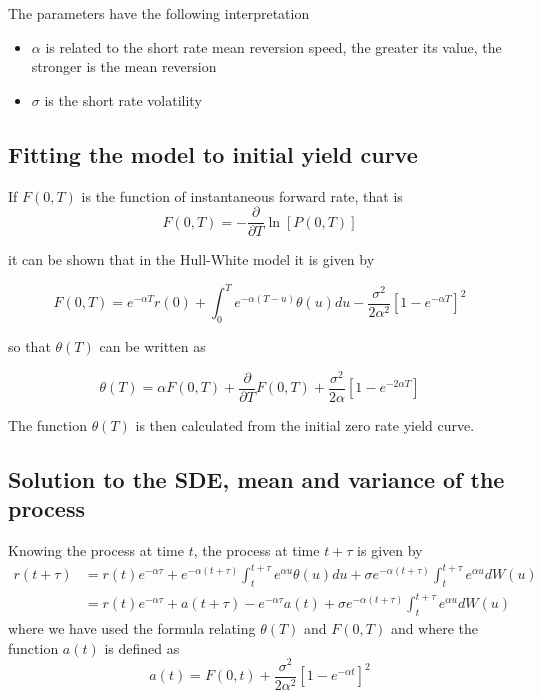 The parameters have the following interpretation
\begin{itemize}
\item $\alpha$ is related to the short rate mean reversion speed, the greater its value, the stronger is the mean reversion
\item $\sigma$ is the short rate volatility
\end{itemize}

\subsection{Fitting the model to initial yield curve}

If $F(0,T)$ is the function of instantaneous forward rate, that is
\begin{equation}
F(0,T) = -\displaystyle \frac{\partial}{\partial T}\ln[P(0,T)]
\end{equation}

it can be shown that in the Hull-White model it is given by

\begin{equation}
F(0,T) = e^{-\alpha T}r(0) + \int_0^T e^{-\alpha (T-u)}\theta(u)du - \frac{\sigma^2}{2\alpha^2}\left[1-e^{-\alpha T}\right]^2
\end{equation}

so that $\theta(T)$ can be written as

\begin{equation}
\theta(T) = \alpha F(0,T)+\frac{\partial}{\partial T}F(0,T)+\frac{\sigma^2}{2\alpha}\left[1-e^{-2\alpha T}\right]
\end{equation}

The function $\theta(T)$ is then calculated from the initial zero rate yield curve.

\subsection{Solution to the SDE, mean and variance of the process}

Knowing the process at time $t$, the process at time $t+\tau$ is given by
\begin{align}
r(t+\tau) & = r(t) e^{-\alpha \tau} + e^{-\alpha (t+\tau)}\int_t^{t+\tau}\!\!\!\!e^{\alpha u}\theta(u)du + \sigma e^{-\alpha (t+\tau)}\int_t^{t+\tau}\!\!\!\!e^{\alpha u}dW(u)\\
 & = r(t) e^{-\alpha \tau} + a(t+\tau) - e^{-\alpha \tau} a(t) + \sigma e^{-\alpha (t+\tau)}\int_t^{t+\tau}\!\!\!\!e^{\alpha u}dW(u) \label{eq:HWevol}
\end{align}
where we have used the formula relating $\theta(T)$ and $F(0,T)$ and where the function $a(t)$ is defined as
\begin{equation}
a(t) = F(0,t) + \frac{\sigma^2}{2\alpha^2}\left[1-e^{-\alpha t}\right]^2
\end{equation}

